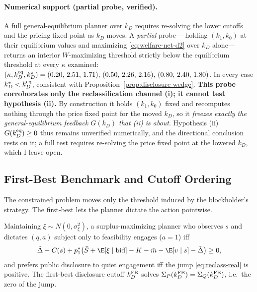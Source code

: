 \paragraph{Numerical support (partial probe, verified).}
A full general-equilibrium planner over $k_D$ requires re-solving the lower
cutoffs and the pricing fixed point as $k_D$ moves. A \emph{partial} probe---%
holding $(k_1,k_0)$ at their equilibrium values and maximizing
\eqref{eq:welfare-net-d2} over $k_D$ alone---returns an interior $W$-maximizing
threshold strictly below the equilibrium threshold at every $\kappa$ examined:
$(\kappa,k_D^{\textup{eq}},k_D^{\star})=(0.20,\,2.51,\,1.71),\,
(0.50,\,2.26,\,2.16),\,(0.80,\,2.40,\,1.80)$.%
In every case $k_D^{\star}<k_D^{\textup{eq}}$, consistent with
Proposition~\ref{prop:disclosure-wedge}. \textbf{This probe corroborates only the
reclassification channel (i); it cannot test hypothesis (ii).} By construction it
holds $(k_1,k_0)$ fixed and recomputes nothing through the price fixed point for
the moved $k_D$, so it \emph{freezes exactly the general-equilibrium feedback
$G(k_D)$ that (ii) is about}. Hypothesis (ii) $G(k_D^{\textup{eq}})\ge0$ thus
remains unverified numerically, and the directional conclusion rests on it; a full
test requires re-solving the price fixed point at the lowered $k_D$, which I leave
open.

%
\subsection{First-Best Benchmark and Cutoff Ordering}
\label{sec:welf-fb}
%

The constrained problem moves only the threshold induced by the blockholder's
strategy. The first-best lets the planner dictate the action pointwise.

\begin{proposition}
\label{prop:firstbest-d2}
Maintaining $\xi\sim N(0,\sigma_\xi^2)$, a surplus-maximizing planner who observes
$s$ and dictates $(q,a)$ subject only to feasibility engages ($a=1$) iff
\begin{equation}
\tilde\Delta-C(s)+p_1^{\ast}\big(\bar S+\E[\xi\mid\textup{bid}]-K-\tilde m
   -\E[v\mid s]-\tilde\Delta\big)\ge0,
\label{eq:fb-engage}
\end{equation}
and prefers public disclosure to quiet engagement iff the jump
\eqref{eq:reclass-real} is positive. The first-best disclosure cutoff
$k_D^{\textup{FB}}$ solves $\Sigma_P(k_D^{\textup{FB}})=\Sigma_Q(k_D^{\textup{FB}})$,
i.e.\ the zero of the jump.
\end{proposition}

